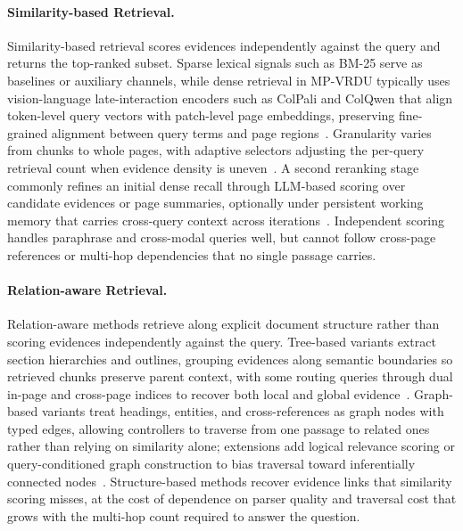 \documentclass[11pt]{article}
\begin{document}
\paragraph{Similarity-based Retrieval.}
\label{sec:similarity-based}
Similarity-based retrieval scores evidences independently against the query and returns the top-ranked subset. Sparse lexical signals such as BM-25 serve as baselines or auxiliary channels, while dense retrieval in MP-VRDU typically uses vision-language late-interaction encoders such as ColPali and ColQwen that align token-level query vectors with patch-level page embeddings, preserving fine-grained alignment between query terms and page regions~\cite{cho2024m3docrag, jain2025simpledoc}. Granularity varies from chunks to whole pages, with adaptive selectors adjusting the per-query retrieval count when evidence density is uneven~\cite{li2025avir}. A second reranking stage commonly refines an initial dense recall through LLM-based scoring over candidate evidences or page summaries, optionally under persistent working memory that carries cross-query context across iterations~\cite{zhang2024cream,xu2026mmr5}. Independent scoring handles paraphrase and cross-modal queries well, but cannot follow cross-page references or multi-hop dependencies that no single passage carries.

\paragraph{Relation-aware Retrieval.}
Relation-aware methods retrieve along explicit document structure rather than scoring evidences independently against the query. Tree-based variants extract section hierarchies and outlines, grouping evidences along semantic boundaries so retrieved chunks preserve parent context, with some routing queries through dual in-page and cross-page indices to recover both local and global evidence~\cite{shin2025multidocfusion, sun2025docagent, gong2025mhier}. Graph-based variants treat headings, entities, and cross-references as graph nodes with typed edges, allowing controllers to traverse from one passage to related ones rather than relying on similarity alone; extensions add logical relevance scoring or query-conditioned graph construction to bias traversal toward inferentially connected nodes~\cite{wang2024knowledge, wu2025molorag, zhang2026mldocrag}. Structure-based methods recover evidence links that similarity scoring misses, at the cost of dependence on parser quality and traversal cost that grows with the multi-hop count required to answer the question.
\end{document}
